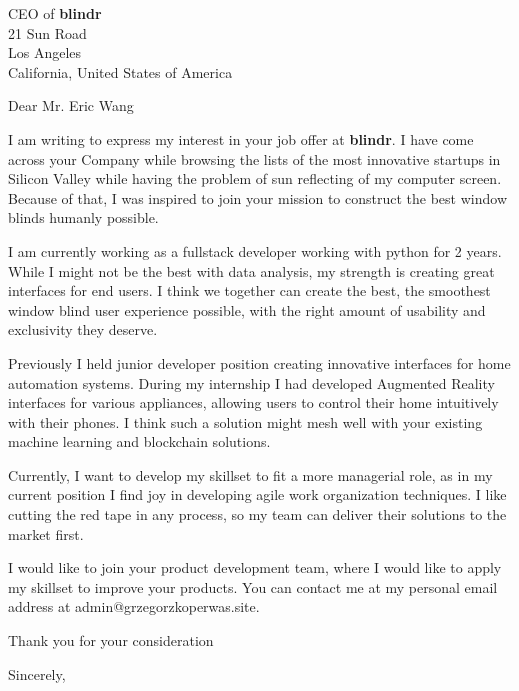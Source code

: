 \documentclass{letter}
\begin{document}
\begin{letter}{CEO of \textbf{blindr}\\ 21 Sun Road \\ Los Angeles\\ California,
United States of America}

\opening{Dear Mr. Eric Wang}

I am writing to express my interest in your job offer at \textbf{blindr}. I have come across your Company while browsing the lists of the most innovative startups in Silicon Valley while having the problem of sun reflecting of my computer screen. Because of that, I was inspired to join your mission to construct the best window blinds humanly possible.

I am currently working as a fullstack developer working with python for 2 years. While I might not be the best with data analysis, my strength is creating great interfaces for end users. I think we together can create the best, the smoothest window blind user experience possible, with the right amount of usability and exclusivity they deserve.

Previously I held junior developer position creating innovative interfaces for home automation systems. During my internship I had developed Augmented Reality interfaces for various appliances, allowing users to control their home intuitively with their phones. I think such a solution might mesh well with your existing machine learning and blockchain solutions.

Currently, I want to develop my skillset to fit a more managerial role, as in my current position I find joy in developing agile work organization techniques. I like cutting the red tape in any process, so my team can deliver their solutions to the market first.

I would like to join your product development team, where I would like to apply my skillset to improve your products. You can contact me at my personal email address at admin@grzegorzkoperwas.site.


Thank you for your consideration

\closing{Sincerely,}
\end{letter}
\end{document}
